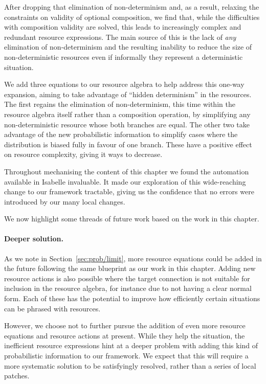 \documentclass[class=smolathesis,crop=false]{standalone}
\begin{document}
After dropping that elimination of non-determinism and, as a result, relaxing the constraints on validity of optional composition, we find that, while the difficulties with composition validity are solved, this leads to increasingly complex and redundant resource expressions.
The main source of this is the lack of \emph{any} elimination of non-determinism and the resulting inability to reduce the size of non-deterministic resources even if informally they represent a deterministic situation.

We add three equations to our resource algebra to help address this one-way expansion, aiming to take advantage of ``hidden determinism'' in the resources.
The first regains the elimination of non-determinism, this time within the resource algebra itself rather than a composition operation, by simplifying any non-deterministic resource whose both branches are equal.
The other two take advantage of the new probabilistic information to simplify cases where the distribution is biased fully in favour of one branch.
These have a positive effect on resource complexity, giving it ways to decrease.

Throughout mechanising the content of this chapter we found the automation available in Isabelle invaluable.
It made our exploration of this wide-reaching change to our framework tractable, giving us the confidence that no errors were introduced by our many local changes.

We now highlight some threads of future work based on the work in this chapter.

\paragraph*{Deeper solution.}
As we note in Section~\ref{sec:prob/limit}, more resource equations could be added in the future following the same blueprint as our work in this chapter.
Adding new resource actions is also possible where the target connection is not suitable for inclusion in the resource algebra, for instance due to not having a clear normal form.
Each of these has the potential to improve how efficiently certain situations can be phrased with resources.

However, we choose not to further pursue the addition of even more resource equations and resource actions at present.
While they help the situation, the inefficient resource expressions hint at a deeper problem with adding this kind of probabilistic information to our framework.
We expect that this will require a more systematic solution to be satisfyingly resolved, rather than a series of local patches.
\end{document}

